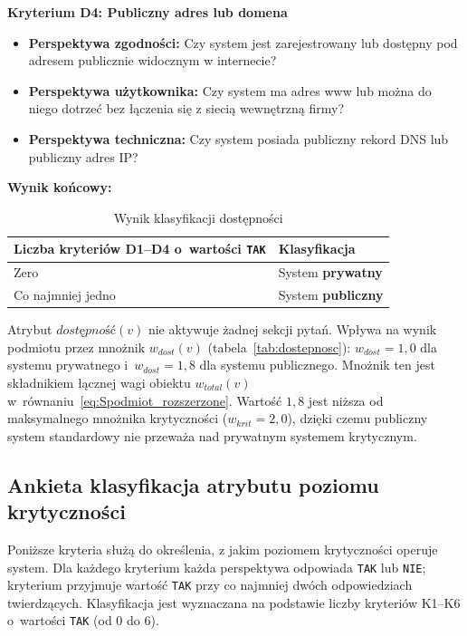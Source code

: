 
\textbf{Kryterium D4: Publiczny adres lub domena}

\begin{itemize}
\item \textbf{Perspektywa zgodności:} Czy system jest zarejestrowany lub dostępny pod adresem publicznie widocznym w internecie?
\item \textbf{Perspektywa użytkownika:} Czy system ma adres www lub można do niego dotrzeć bez łączenia się z siecią wewnętrzną firmy?
\item \textbf{Perspektywa techniczna:} Czy system posiada publiczny rekord DNS lub publiczny adres IP?
\end{itemize}


\bigskip
\textbf{Wynik końcowy:}

\begin{table}[ht]
\centering
\caption{Wynik klasyfikacji dostępności}
\label{tab:wynik-dostepnosc}
\begin{tabular}{p{10cm} p{4cm}}
\toprule
Liczba kryteriów D1--D4 o~wartości \texttt{TAK} & Klasyfikacja \\
\midrule
Zero     & System \textbf{prywatny}    \\
\midrule
Co najmniej jedno     & System \textbf{publiczny}     \\
\bottomrule
\end{tabular}
\end{table}

\noindent Atrybut $\textit{dostępność}(v)$ nie aktywuje żadnej sekcji pytań. Wpływa na wynik podmiotu przez mnożnik $w_{dost}(v)$ (tabela~\ref{tab:dostepnosc}): $w_{dost} = 1{,}0$ dla systemu prywatnego i~$w_{dost} = 1{,}8$ dla systemu publicznego. Mnożnik ten jest składnikiem łącznej wagi obiektu $w_{total}(v)$ w~równaniu~\eqref{eq:Spodmiot_rozszerzone}. Wartość $1{,}8$ jest niższa od maksymalnego mnożnika krytyczności ($w_{krit} = 2{,}0$), dzięki czemu publiczny system standardowy nie przeważa nad prywatnym systemem krytycznym.




\subsection{Ankieta klasyfikacja atrybutu poziomu krytyczności}
Poniższe kryteria służą do określenia, z jakim poziomem krytyczności operuje system. Dla każdego kryterium każda perspektywa odpowiada \texttt{TAK} lub \texttt{NIE}; kryterium przyjmuje wartość \texttt{TAK} przy co najmniej dwóch odpowiedziach twierdzących. Klasyfikacja jest wyznaczana na podstawie liczby kryteriów K1--K6 o~wartości \texttt{TAK} (od 0 do 6).


